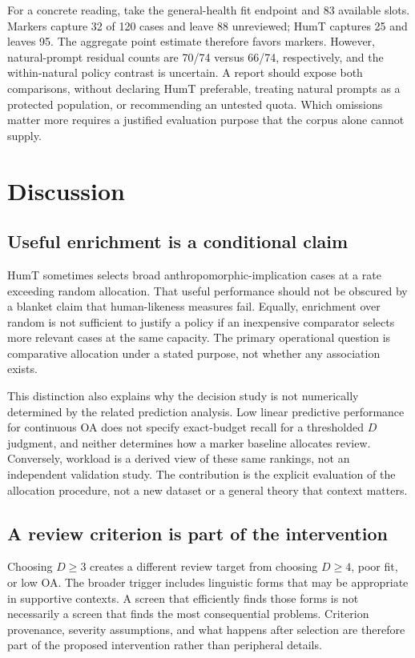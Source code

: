\documentclass[manuscript,screen,review,anonymous]{acmart}
\begin{document}
For a concrete reading, take the general-health fit endpoint and 83 available slots. Markers capture 32 of 120 cases and leave 88 unreviewed; HumT captures 25 and leaves 95. The aggregate point estimate therefore favors markers. However, natural-prompt residual counts are 70/74 versus 66/74, respectively, and the within-natural policy contrast is uncertain. A report should expose both comparisons, without declaring HumT preferable, treating natural prompts as a protected population, or recommending an untested quota. Which omissions matter more requires a justified evaluation purpose that the corpus alone cannot supply.

\section{Discussion}
\subsection{Useful enrichment is a conditional claim}
HumT sometimes selects broad anthropomorphic-implication cases at a rate exceeding random allocation. That useful performance should not be obscured by a blanket claim that human-likeness measures fail. Equally, enrichment over random is not sufficient to justify a policy if an inexpensive comparator selects more relevant cases at the same capacity. The primary operational question is comparative allocation under a stated purpose, not whether any association exists.

This distinction also explains why the decision study is not numerically determined by the related prediction analysis. Low linear predictive performance for continuous OA does not specify exact-budget recall for a thresholded $D$ judgment, and neither determines how a marker baseline allocates review. Conversely, workload is a derived view of these same rankings, not an independent validation study. The contribution is the explicit evaluation of the allocation procedure, not a new dataset or a general theory that context matters.

\subsection{A review criterion is part of the intervention}
Choosing $D\geq3$ creates a different review target from choosing $D\geq4$, poor fit, or low OA. The broader trigger includes linguistic forms that may be appropriate in supportive contexts. A screen that efficiently finds those forms is not necessarily a screen that finds the most consequential problems. Criterion provenance, severity assumptions, and what happens after selection are therefore part of the proposed intervention rather than peripheral details.
\end{document}
